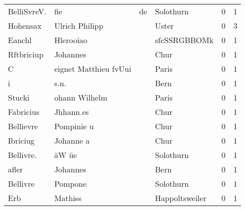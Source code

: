 \begin{tabular}{llllrr}
              BelliSvreV. &                                fie &          de &                                   Solothurn &          0 &         1 \\
                 Hohensax &                     Ulrich Philipp &             &                                       Uster &          0 &         3 \\
                   Eanchl &                          Hlerooiao &             &                                sfcSSRGBBOMk &          0 &         1 \\
               Rftbriciup &                           Johannes &             &                                        Chur &          0 &         1 \\
                        C &              eignet Matthieu fvUui &             &                                       Paris &          0 &         1 \\
                        i &                               s.n. &             &                                        Bern &          0 &         1 \\
                   Stucki &                      ohann Wilhelm &             &                                       Paris &          0 &         1 \\
                Fabricius &                          Jhhann.es &             &                                        Chur &          0 &         1 \\
                Bellievre &                         Pompinie u &             &                                        Chur &          0 &         1 \\
                 Ibriciug &                          Johanne a &             &                                        Chur &          0 &         1 \\
                Bellivre. &                              äW üe &             &                                   Solothurn &          0 &         1 \\
                    afler &                           Johannes &             &                                        Bern &          0 &         1 \\
                 Bellivre &                            Pompone &             &                                   Solothurn &          0 &         1 \\
                      Erb &                            Mathiss &             &                              Happoltsweiler &          0 &         1 \\

\end{tabular}
